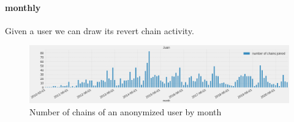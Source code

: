 


    


\paragraph*{monthly}
Given a user we can draw its revert chain activity. 
\begin{figure}[H]
    \centering
    \includegraphics[width=\textwidth]{./chapters/04/assets/chains_user_month.png}
    \caption{Number of chains of an anonymized user by month}
    \label{fig:chainsusermonth}
\end{figure}




